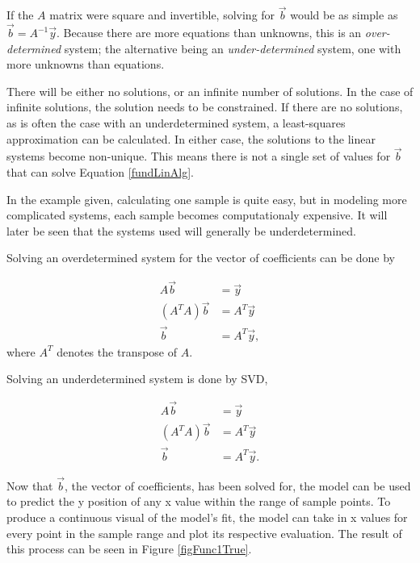 \par If the $A$ matrix were square and invertible, solving for $\vec{b}$ would be as simple as $\vec{b} = A^{-1}\vec{y}$. Because there are more equations than unknowns, this is an \textit{over-determined} system; the alternative being an \textit{under-determined} system, one with more unknowns than equations.
\par There will be either no solutions, or an infinite number of solutions. In the case of infinite solutions, the solution needs to be constrained. If there are no solutions, as is often the case with an underdetermined system, a least-squares approximation can be calculated. In either case, the solutions to the linear systems become non-unique. This means there is not a single set of values for $\vec{b}$ that can solve Equation \ref{fundLinAlg}.
\par In the example given, calculating one sample is quite easy, but in modeling more complicated systems, each sample becomes computationaly expensive. It will later be seen that the systems used will generally be underdetermined.
\par Solving an overdetermined system for the vector of coefficients can be done by 

\begin{align}
A\vec{b} &= \vec{y} \\
(A^TA)\vec{b} &= A^T\vec{y} \\
\vec{b} &= A^T\vec{y},
\end{align}
where $A^T$ denotes the transpose of $A$.

\par Solving an underdetermined system is done by SVD,

\begin{align}
A\vec{b} &= \vec{y} \\
(A^TA)\vec{b} &= A^T\vec{y} \\
\vec{b} &= A^T\vec{y}.
\end{align}

\par Now that $\vec{b}$, the vector of coefficients, has been solved for, the model can be used to predict the y position of any x value within the range of sample points. To produce a continuous visual of the model's fit, the model can take in x values for every point in the sample range and plot its respective evaluation. The result of this process can be seen in Figure \ref{figFunc1True}.

